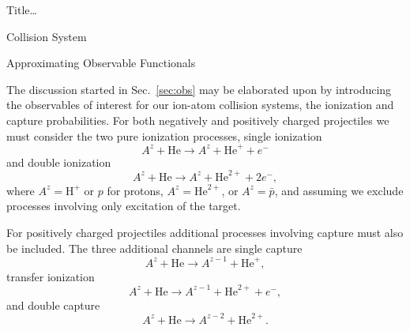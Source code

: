 \documentclass[letterpaper, 11 pt]{report}
\begin{document}
\begin{chapter}{ Title\dots \label{chap:p-he2p-he}}
\begin{section}{Collision System \label{sec:p-he2p-he-sys}}
   \end{section}

   \begin{section}{Approximating Observable Functionals \label{sec:phe2p-obs}}

      The discussion started in Sec.~\ref{sec:obs} may be elaborated upon by introducing the observables
      of interest for our ion-atom collision systems, the ionization and capture probabilities. For both
      negatively and positively charged projectiles we must consider the two pure ionization processes,
      single ionization
      \begin{equation} \label{eq:TI}
         A^z + \mathrm{He} \rightarrow A^z + \mathrm{He}^+ + e^-
      \end{equation}
      and double ionization
      \begin{equation} \label{eq:II}
         A^z + \mathrm{He} \rightarrow A^z + \mathrm{He}^{2+} + 2e^-,
      \end{equation}
      where $A^z = \mathrm{H}^+$ or $p$ for protons, $A^z = \mathrm{He}^{2+}$, or $A^z = \bar{p}$, and
      assuming we exclude processes involving only excitation of the target.

      For positively charged projectiles additional processes involving capture must also be included.
      The three additional channels are single capture
      \begin{equation} \label{eq:TP}
         A^z + \mathrm{He} \rightarrow A^{z-1} + \mathrm{He}^{+},
      \end{equation}
      transfer ionization
      \begin{equation} \label{eq:IP}
         A^z + \mathrm{He} \rightarrow A^{z-1} + \mathrm{He}^{2+} + e^-,
      \end{equation}
      and double capture
      \begin{equation} \label{eq:PP}
         A^z + \mathrm{He} \rightarrow A^{z-2} + \mathrm{He}^{2+}.
      \end{equation}


\end{section}
\end{chapter}
\end{document}
